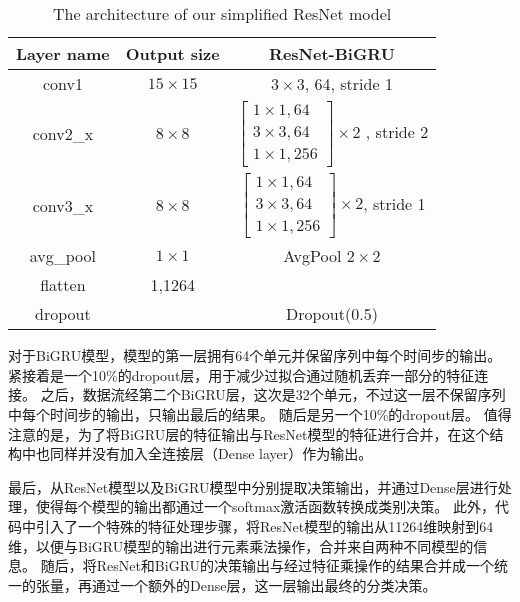 \begin{table}[htbp]
  \label{tab:resnet_description}
  \caption{The architecture of our simplified ResNet model}
  \centering
  \begin{tabular}{c|c|c}
    \hline
  Layer name & Output size & ResNet-BiGRU \\
  \hline
  conv1 & $15 \times 15$ & $3\times3$, 64, stride 1 \\
  \hline
  \multirow{4}{*}{conv2\_x} & \multirow{4}{*}{\centering $8 \times 8$} &
  \multirow{4}{*}{$\left[\begin{array}{c}
      1 \times 1, 64 \\
      3 \times 3, 64 \\
      1 \times 1, 256 
  \end{array}\right] \times 2$ , stride 2} \\
  &&\\
  &&\\
  &&\\
  \hline
  \multirow{4}{*}{conv3\_x} & \multirow{4}{*}{\centering $8 \times 8$} &
  \multirow{4}{*}{$\left[\begin{array}{c}
    1 \times 1, 64 \\
    3 \times 3, 64 \\
    1 \times 1, 256 
  \end{array}\right] \times 2$, stride 1} \\
  &&\\
  &&\\
  &&\\
  \hline
  avg\_pool & $1 \times 1$ & AvgPool $2 \times 2$ \\
  \hline
  flatten &1,1264&  \\
  \hline
  dropout & & Dropout(0.5) \\
  \hline
  \end{tabular}
\end{table}


对于BiGRU模型，模型的第一层拥有64个单元并保留序列中每个时间步的输出。
紧接着是一个10\%的dropout层，用于减少过拟合通过随机丢弃一部分的特征连接。
之后，数据流经第二个BiGRU层，这次是32个单元，不过这一层不保留序列中每个时间步的输出，只输出最后的结果。
随后是另一个10\%的dropout层。
值得注意的是，为了将BiGRU层的特征输出与ResNet模型的特征进行合并，在这个结构中也同样并没有加入全连接层（Dense layer）作为输出。\par


最后，从ResNet模型以及BiGRU模型中分别提取决策输出，并通过Dense层进行处理，使得每个模型的输出都通过一个softmax激活函数转换成类别决策。
此外，代码中引入了一个特殊的特征处理步骤，将ResNet模型的输出从11264维映射到64维，以便与BiGRU模型的输出进行元素乘法操作，合并来自两种不同模型的信息。
随后，将ResNet和BiGRU的决策输出与经过特征乘操作的结果合并成一个统一的张量，再通过一个额外的Dense层，这一层输出最终的分类决策。

